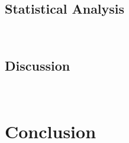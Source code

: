 \documentclass[parskip=full]{scrartcl}
\begin{document}


\subsection{Statistical Analysis}~\label{sec:statistical-analysis}


\begin{table}[htb]
	\centering
    \caption{%
    	Adjusted p-values using the Wilcoxon signed-rank method. Bold values
        are statistically significant at a level of $\alpha = 0.05$. The 
        null hypothesis is that the performance of the proposed
        framework is similar to that of the original framework.
    }\label{tab:wilcoxon_test}
\end{table}



\subsection{Discussion}~\label{sec:sub_discussion}

\section{Conclusion}~\label{sec:conclusion}




\end{document}
